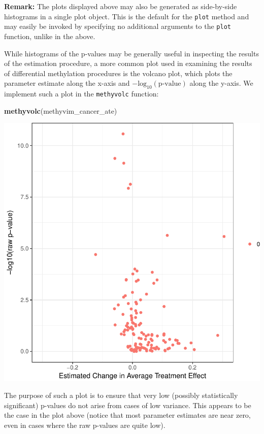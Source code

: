 \documentclass[9pt,a4paper,]{extarticle}
\newenvironment{Shaded}{\begin{snugshade}}{\end{snugshade}}
\newcommand{\KeywordTok}[1]{\textcolor[rgb]{0.13,0.29,0.53}{\textbf{#1}}}
\newcommand{\NormalTok}[1]{#1}
\theoremstyle{definition}
\theoremstyle{definition}
\theoremstyle{definition}
\theoremstyle{remark}
\begin{document}
\textbf{Remark:} The plots displayed above may also be generated as side-by-side
histograms in a single plot object. This is the default for the \texttt{plot} method
and may easily be invoked by specifying no additional arguments to the \texttt{plot}
function, unlike in the above.

While histograms of the p-values may be generally useful in inspecting the
results of the estimation procedure, a more common plot used in examining the
results of differential methylation procedures is the volcano plot, which plots
the parameter estimate along the x-axis and \(-\text{log}_{10}(\text{p-value})\)
along the y-axis. We implement such a plot in the \texttt{methyvolc} function:

\begin{Shaded}
\begin{Highlighting}[]
\KeywordTok{methyvolc}\NormalTok{(methyvim_cancer_ate)}
\end{Highlighting}
\end{Shaded}

\begin{center}\includegraphics{paper_BiocF1000_files/figure-latex/methyvim-volcano-1} \end{center}

The purpose of such a plot is to ensure that very low (possibly statistically
significant) p-values do not arise from cases of low variance. This appears to
be the case in the plot above (notice that most parameter estimates are near
zero, even in cases where the raw p-values are quite low).
\end{document}
